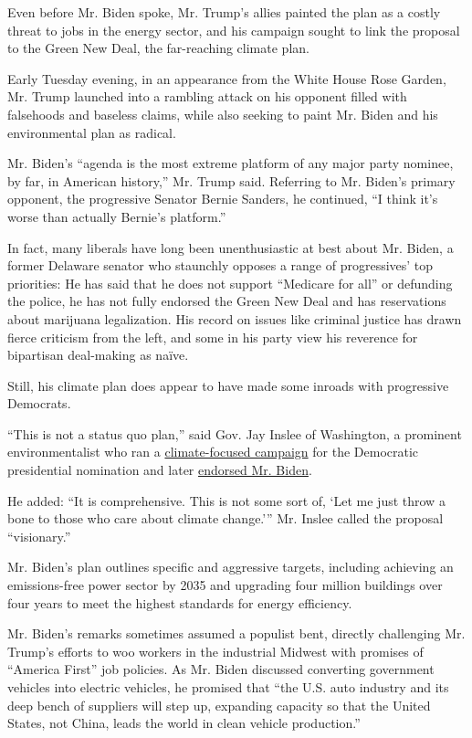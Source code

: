 Even before Mr. Biden spoke, Mr. Trump's allies painted the plan as a
costly threat to jobs in the energy sector, and his campaign sought to
link the proposal to the Green New Deal, the far-reaching climate plan.

Early Tuesday evening, in an appearance from the White House Rose
Garden, Mr. Trump launched into a rambling attack on his opponent filled
with falsehoods and baseless claims, while also seeking to paint Mr.
Biden and his environmental plan as radical.

Mr. Biden's ``agenda is the most extreme platform of any major party
nominee, by far, in American history,'' Mr. Trump said. Referring to Mr.
Biden's primary opponent, the progressive Senator Bernie Sanders, he
continued, ``I think it's worse than actually Bernie's platform.''

In fact, many liberals have long been unenthusiastic at best about Mr.
Biden, a former Delaware senator who staunchly opposes a range of
progressives' top priorities: He has said that he does not support
``Medicare for all'' or defunding the police, he has not fully endorsed
the Green New Deal and has reservations about marijuana legalization.
His record on issues like criminal justice has drawn fierce criticism
from the left, and some in his party view his reverence for bipartisan
deal-making as naïve.

Still, his climate plan does appear to have made some inroads with
progressive Democrats.

``This is not a status quo plan,'' said Gov. Jay Inslee of Washington, a
prominent environmentalist who ran a
\href{https://www.nytimes3xbfgragh.onion/2019/08/21/us/politics/jay-inslee-2020-campaign.html}{climate-focused
campaign} for the Democratic presidential nomination and later
\href{https://www.nytimes3xbfgragh.onion/2020/04/22/us/politics/jay-inslee-endorses-biden.html}{endorsed
Mr. Biden}.

He added: ``It is comprehensive. This is not some sort of, `Let me just
throw a bone to those who care about climate change.''' Mr. Inslee
called the proposal ``visionary.''

Mr. Biden's plan outlines specific and aggressive targets, including
achieving an emissions-free power sector by 2035 and upgrading four
million buildings over four years to meet the highest standards for
energy efficiency.

Mr. Biden's remarks sometimes assumed a populist bent, directly
challenging Mr. Trump's efforts to woo workers in the industrial Midwest
with promises of ``America First'' job policies. As Mr. Biden discussed
converting government vehicles into electric vehicles, he promised that
``the U.S. auto industry and its deep bench of suppliers will step up,
expanding capacity so that the United States, not China, leads the world
in clean vehicle production.''

